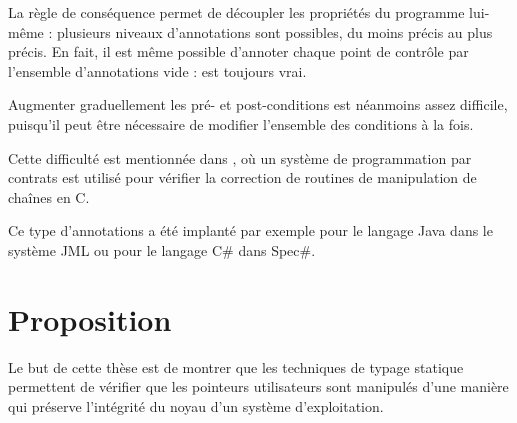 La règle de conséquence permet de découpler les propriétés du programme lui-même
: plusieurs niveaux d'annotations sont possibles, du moins précis au plus
précis. En fait, il est même possible d'annoter chaque point de contrôle par
l'ensemble d'annotations vide :  est toujours vrai.

Augmenter graduellement les pré- et post-conditions est néanmoins assez
difficile, puisqu'il peut être nécessaire de modifier l'ensemble des conditions
à la fois.

Cette difficulté est mentionnée dans \cite{cssv}, où un système de programmation
par contrats est utilisé pour vérifier la correction de routines de manipulation
de chaînes en C.

Ce type d'annotations a été implanté par exemple pour le langage Java dans le
système JML\cite{jmlkluwer} ou pour le langage C\# dans Spec\#\cite{krml136}.


\section{Proposition}


Le but de cette thèse est de montrer que les techniques de typage statique
permettent de vérifier que les pointeurs utilisateurs sont manipulés d'une
manière qui préserve l'intégrité du noyau d'un système d'exploitation.


